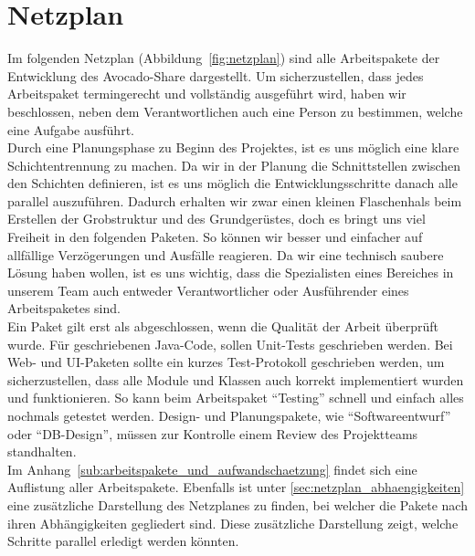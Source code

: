 \section{Netzplan}
Im folgenden Netzplan (Abbildung~\ref{fig:netzplan}) sind alle Arbeitspakete der Entwicklung des Avocado-Share dargestellt. 
Um sicherzustellen, dass jedes Arbeitspaket termingerecht und vollständig ausgeführt wird, haben wir beschlossen, neben dem Verantwortlichen auch eine Person zu bestimmen, welche eine Aufgabe ausführt.\\

Durch eine Planungsphase zu Beginn des Projektes, ist es uns möglich eine klare Schichtentrennung zu machen.
Da wir in der Planung die Schnittstellen zwischen den Schichten definieren, ist es uns möglich die Entwicklungsschritte danach
alle parallel auszuführen. Dadurch erhalten wir zwar einen kleinen Flaschenhals beim Erstellen der Grobstruktur und des
Grundgerüstes, doch es bringt uns viel Freiheit in den folgenden Paketen. So können wir besser und einfacher auf allfällige
Verzögerungen und Ausfälle reagieren.
Da wir eine technisch saubere Lösung haben wollen, ist es uns wichtig, dass die Spezialisten eines Bereiches in unserem Team auch entweder Verantwortlicher oder Ausführender eines Arbeitspaketes sind. \\

Ein Paket gilt erst als abgeschlossen, wenn die Qualität der Arbeit überprüft wurde.
Für geschriebenen Java-Code, sollen Unit-Tests geschrieben werden. Bei Web- und UI-Paketen sollte ein kurzes Test-Protokoll geschrieben werden, um sicherzustellen, dass alle Module und Klassen auch korrekt implementiert wurden und funktionieren.
So kann beim Arbeitspaket "`Testing"' schnell und einfach alles nochmals getestet werden. Design- und Planungspakete, wie "`Softwareentwurf"' oder "`DB-Design"', müssen zur Kontrolle einem Review des Projektteams standhalten.\\

Im Anhang~\ref{sub:arbeitspakete_und_aufwandschaetzung} findet sich eine Auflistung aller Arbeitspakete. Ebenfalls ist unter \ref{sec:netzplan_abhaengigkeiten} eine zusätzliche Darstellung des Netzplanes zu finden, bei welcher die Pakete nach ihren Abhängigkeiten gegliedert sind. Diese zusätzliche Darstellung zeigt, welche Schritte parallel erledigt werden könnten.


